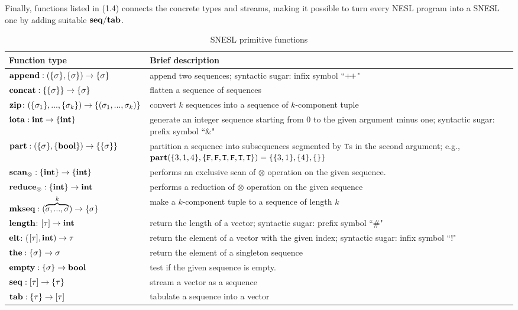 Finally, functions listed in (1.4) connects the concrete types and streams, making it possible to turn every NESL program into a SNESL one by adding suitable $\mathbf{seq}/\mathbf{tab}$.

\begin{table}\large
	\renewcommand\arraystretch{1.8}
	\centering
	\begin{tabular}{|p{}|p{}|}
		\hline
		Function type & Brief description  \\ \hline
		$\mathbf{append : (\{\sigma\}, \{\sigma\}) \rightarrow \{\sigma\}}$ & append two sequences; syntactic sugar: infix symbol ``${\++}$" \\ \hline
		$\mathbf{concat: \{\{\sigma\}\} \rightarrow \{\sigma\} }$ &  flatten a sequence of sequences                 \\ \hline
		$\mathbf{zip} \colon (\{\sigma_1\}, ..., \{\sigma_k\})\rightarrow \{(\sigma_1,...,\sigma_k)\}$ & convert $k$ sequences into a sequence of $k$-component tuple \\ \hline
		$\mathbf{iota: \mathbf{int} \rightarrow \{\mathbf{int}\}}$  &  generate an integer sequence starting from 0 to the given argument minus one; syntactic sugar: prefix symbol ``\&"    \\ \hline
		$\mathbf{part: (\{\sigma\}, \{\mathbf{bool}\}) \rightarrow  \{\{\sigma\}\}}$   & partition a sequence into subsequences segmented by $\mathtt{T}$s in the second argument; e.g., $\mathbf{part}(\{3,1,4\}, \{\mathtt{F},\mathtt{F},\mathtt{T},\mathtt{F},\mathtt{T},\mathtt{T}\}) = \{\{3,1\},\{4\},\{\}\}$                \\ \hline
		$\mathbf{scan_\otimes}: \{\mathbf{int}\} \rightarrow \{\mathbf{int}\}$     &  performs an exclusive scan of $\otimes$ operation on the given sequence.    \\ \hline
		$\mathbf{reduce_\otimes: \{\mathbf{int}\} \rightarrow \mathbf{int} }$     &   performs a reduction of $\otimes$ operation on the given sequence             \\ \hline
		$\mathbf{mkseq}: (\overbrace{\sigma,...,\sigma}^{k}) \rightarrow \{\sigma\}$  & make a $k$-component tuple to a sequence of length $k$ \\ \hline  
	    $\mathbf{length}$: $[\tau] \rightarrow \mathbf{int}$ & return the length of a vector; syntactic sugar: prefix symbol ``\#" \\ \hline  
	    $\mathbf{elt}$: ($[\tau], \mathbf{int}) \rightarrow \tau$  & return the  element of a vector with the given index; syntactic sugar: infix symbol ``!" \\ \hline  
	    $\mathbf{the:  \{\sigma\} \rightarrow \sigma}$     &     return the element of a singleton sequence           \\ \hline
	    $\mathbf{empty:  \{\sigma\} \rightarrow \mathbf{bool}}$       & test if the given sequence is empty.             \\ \hline  
	    $\mathbf{seq}: [\tau] \rightarrow \{\tau\} $  & stream a vector as a sequence \\ \hline  
	    $\mathbf{tab}: \{\tau\} \rightarrow [\tau] $  & tabulate a sequence into a vector\\ \hline  
	\end{tabular}
	\caption{SNESL primitive functions}
	\label{tab:snesl-funcs}
\end{table}




